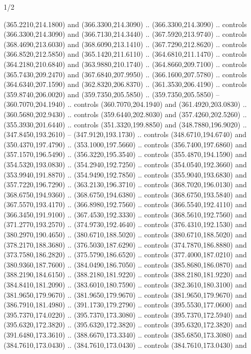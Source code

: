 \begin{flagdescription}{1/2}
\begin{scope}[xshift=0.5\flaglength]
\begin{scope}[scale=0.004\flagwidth,xshift=-90mm,yshift=89mm]
\begin{scope}[y=0.80pt, x=0.80pt, yscale=-1, xscale=1, inner sep=0pt, outer sep=0pt]
  (365.2210,214.1800) and (366.3300,214.3090) .. (366.3300,214.3090) .. controls
  (366.3300,214.3090) and (366.7130,214.3440) .. (367.5920,213.9740) .. controls
  (368.4690,213.6030) and (368.6090,213.1410) .. (367.7290,212.8620) .. controls
  (366.8520,212.5850) and (365.1420,211.6110) .. (364.6810,211.1470) .. controls
  (364.2180,210.6840) and (363.9880,210.1740) .. (364.8660,209.7100) .. controls
  (365.7430,209.2470) and (367.6840,207.9950) .. (366.1600,207.5780) .. controls
  (364.6340,207.1590) and (362.8320,206.8370) .. (361.3530,206.4190) .. controls
  (359.8740,206.0020) and (359.7350,205.5850) .. (359.7350,205.5850) --
  (360.7070,204.1940) .. controls (360.7070,204.1940) and (361.4920,203.0830) ..
  (360.5680,202.9430) .. controls (359.6440,202.8030) and (357.4260,202.5260) ..
  (355.3930,201.6440) .. controls (351.3320,199.8850) and (348.7880,196.9020) ..
  (347.8450,193.2610) -- (347.9120,193.1730) .. controls (348.6710,194.6740) and
  (350.4370,197.4790) .. (353.1000,197.5660) .. controls (356.7400,197.6860) and
  (357.1570,196.5490) .. (356.3220,195.3540) .. controls (355.4870,194.1590) and
  (354.5320,193.0830) .. (354.2940,192.7250) .. controls (354.0540,192.3660) and
  (353.9940,191.8870) .. (354.9490,192.7850) .. controls (355.9040,193.6830) and
  (357.7220,196.7290) .. (363.2130,196.3710) .. controls (368.7020,196.0130) and
  (368.6750,194.9360) .. (368.6750,194.6380) .. controls (368.6750,193.5840) and
  (367.5570,193.4170) .. (366.8980,192.7560) .. controls (366.5540,192.4110) and
  (366.3450,191.9100) .. (367.4530,192.3330) .. controls (368.5610,192.7560) and
  (371.2770,193.2570) .. (374.9730,192.4640) .. controls (376.4310,192.1530) and
  (380.2970,190.4650) .. (380.6710,188.5020) .. controls (380.6710,188.5020) and
  (378.2170,188.3680) .. (376.5030,187.6290) .. controls (374.7870,186.8880) and
  (373.7580,186.2820) .. (375.5790,186.6520) .. controls (377.4000,187.0210) and
  (380.9360,187.7600) .. (384.0490,186.7050) .. controls (385.8680,186.0870) and
  (388.2190,184.6150) .. (388.2180,181.9220) .. controls (388.2180,181.9220) and
  (384.8410,181.2090) .. (383.6010,180.7590) .. controls (382.3610,180.3100) and
  (381.9650,179.9670) .. (381.9650,179.9670) .. controls (381.9650,179.9670) and
  (386.7910,181.4980) .. (391.1730,179.2790) .. controls (395.5530,177.0600) and
  (395.7370,174.0220) .. (395.7370,173.3080) .. controls (395.7370,172.5940) and
  (395.6320,172.3820) .. (395.6320,172.3820) .. controls (395.6320,172.3820) and
  (391.6480,173.3610) .. (388.6670,173.3340) .. controls (385.6850,173.3080) and
  (384.7610,173.0430) .. (384.7610,173.0430) .. controls (384.7610,173.0430) and

\end{scope}
\end{scope}
\end{scope}
\end{flagdescription}
